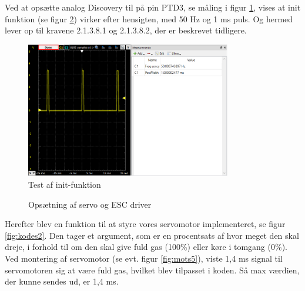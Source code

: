 Ved at opsætte analog Discovery til på pin PTD3, se måling i figur \ref{fig:mots4}, vises at init funktion (se figur \ref{fig:kodes1}) virker efter hensigten, med 50 Hz og 1 ms puls. Og hermed lever op til kravene 2.1.3.8.1 og 2.1.3.8.2, der er beskrevet tidligere.

\begin{figure}[h]
  \centering
  \includegraphics[width=0.8\textwidth]{./figurer/mots4.png}
  \caption{Test af init-funktion}
  \label{fig:mots4}
\end{figure}
\clearpage
\begin{figure}[h]
  \centering
    
  \caption{Opsætning af servo og ESC driver}
  \label{fig:kodes1}
\end{figure}
\clearpage

Herefter blev en funktion til at styre vores servomotor implementeret, se figur \ref{fig:kodes2}. Den tager et argument, som er en procentsats af hvor meget den skal dreje, i forhold til om den skal give fuld gas (100\%) eller køre i tomgang (0\%). Ved montering af servomotor (se evt. figur \ref{fig:mots5}), viste 1,4 ms signal til servomotoren sig at være fuld gas, hvilket blev tilpasset i koden. Så max værdien, der kunne sendes ud, er 1,4 ms.

%   

